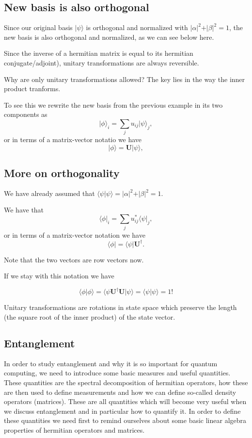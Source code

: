 \subsection{New basis is also orthogonal}

Since our original basis $\vert \psi\rangle$ is orthogonal and normalized with $\vert\alpha\vert^2+\vert\beta\vert^2=1$, the new basis is also orthogonal and normalized, as we can see below here.

Since the inverse of a hermitian matrix is equal to its hermitian
conjugate/adjoint), unitary transformations are always reversible.

Why are only unitary transformations allowed? The key lies in the way the inner product tranforms.

To see this we rewrite the new basis from the previous example in its two components as
\[
\vert \phi\rangle_i=\sum_{j}u_{ij}\vert \psi\rangle_j,
\]
or in terms of a matrix-vector notatio we have
\[
\vert \phi\rangle=\bm{U}\vert \psi\rangle,
\]

\subsection{More on orthogonality}

We have already assumed that $\langle \psi \vert \psi \rangle = \vert\alpha\vert^2+\vert\beta\vert^2=1$.

We have that 
\[
\langle \phi\vert_i=\sum_{j}u_{ij}^*\langle \psi\vert_j,
\]
or in terms of a matrix-vector notation we have
\[
\langle \phi\vert=\langle \psi\vert\bm{U}^{\dagger}.
\]

Note that the two vectors are row vectors now.

If we stay with this notation we have

\[
\langle \phi\vert\phi\rangle = \langle \psi \bm{U}^{\dagger}\bm{U}\vert \psi\rangle = \langle \psi\vert \psi\rangle=1!
\]

Unitary transformations are rotations in state space which preserve the
length (the square root of the inner product) of the state vector.

\subsection{Entanglement}

In order to study entanglement and why it is so important for quantum
computing, we need to introduce some basic measures and useful
quantities.  These quantities are the spectral decomposition of
hermitian operators, how these are then used to define measurements
and how we can define so-called density operators (matrices). These
are all quantities which will become very useful when we discuss
entanglement and in particular how to quantify it. In order to define
these quantities we need first to remind ourselves about some basic linear
algebra properties of hermitian operators and matrices.

